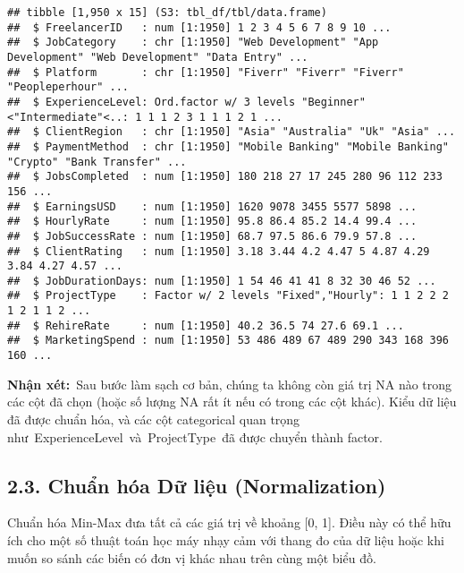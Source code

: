 \documentclass[
]{article}
\begin{document}
\begin{verbatim}
## tibble [1,950 x 15] (S3: tbl_df/tbl/data.frame)
##  $ FreelancerID   : num [1:1950] 1 2 3 4 5 6 7 8 9 10 ...
##  $ JobCategory    : chr [1:1950] "Web Development" "App Development" "Web Development" "Data Entry" ...
##  $ Platform       : chr [1:1950] "Fiverr" "Fiverr" "Fiverr" "Peopleperhour" ...
##  $ ExperienceLevel: Ord.factor w/ 3 levels "Beginner"<"Intermediate"<..: 1 1 1 2 3 1 1 1 2 1 ...
##  $ ClientRegion   : chr [1:1950] "Asia" "Australia" "Uk" "Asia" ...
##  $ PaymentMethod  : chr [1:1950] "Mobile Banking" "Mobile Banking" "Crypto" "Bank Transfer" ...
##  $ JobsCompleted  : num [1:1950] 180 218 27 17 245 280 96 112 233 156 ...
##  $ EarningsUSD    : num [1:1950] 1620 9078 3455 5577 5898 ...
##  $ HourlyRate     : num [1:1950] 95.8 86.4 85.2 14.4 99.4 ...
##  $ JobSuccessRate : num [1:1950] 68.7 97.5 86.6 79.9 57.8 ...
##  $ ClientRating   : num [1:1950] 3.18 3.44 4.2 4.47 5 4.87 4.29 3.84 4.27 4.57 ...
##  $ JobDurationDays: num [1:1950] 1 54 46 41 41 8 32 30 46 52 ...
##  $ ProjectType    : Factor w/ 2 levels "Fixed","Hourly": 1 1 2 2 2 1 2 1 1 2 ...
##  $ RehireRate     : num [1:1950] 40.2 36.5 74 27.6 69.1 ...
##  $ MarketingSpend : num [1:1950] 53 486 489 67 489 290 343 168 396 160 ...
\end{verbatim}

\textbf{Nhận xét:}~Sau bước làm sạch cơ bản, chúng ta không còn giá trị
NA nào trong các cột đã chọn (hoặc số lượng NA rất ít nếu có trong các
cột khác). Kiểu dữ liệu đã được chuẩn hóa, và các cột categorical quan
trọng như~ExperienceLevel~và~ProjectType~đã được chuyển thành factor.

\subsection{2.3. Chuẩn hóa Dữ liệu
(Normalization)}\label{chuux1ea9n-huxf3a-dux1eef-liux1ec7u-normalization}

Chuẩn hóa Min-Max đưa tất cả các giá trị về khoảng {[}0, 1{]}. Điều này
có thể hữu ích cho một số thuật toán học máy nhạy cảm với thang đo của
dữ liệu hoặc khi muốn so sánh các biến có đơn vị khác nhau trên cùng một
biểu đồ.
\end{document}
